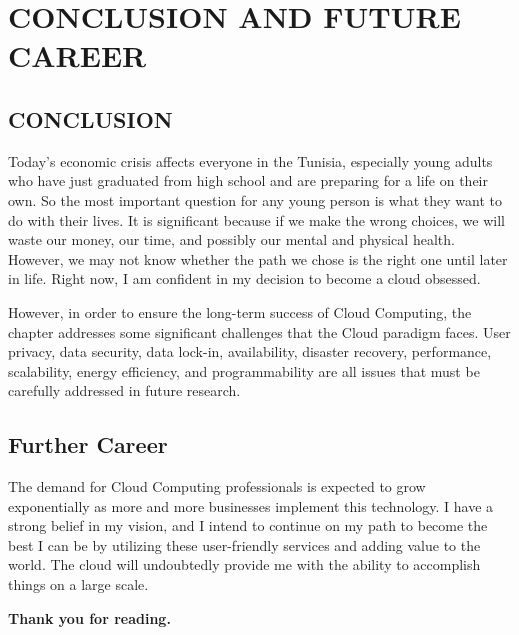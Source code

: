 \chapter*{CONCLUSION AND FUTURE CAREER}

\section{CONCLUSION}

Today's economic crisis affects everyone in the Tunisia, especially young adults who have just graduated from high school and are preparing for a life on their own. So the most important question for any young person is what they want to do with their lives. It is significant because if we make the wrong choices, we will waste our money, our time, and possibly our mental and physical health. However, we may not know whether the path we chose is the right one until later in life. Right now, I am confident in my decision to become a cloud obsessed.


However, in order to ensure the long-term success of Cloud Computing, the chapter addresses some significant challenges that the Cloud paradigm faces. User privacy, data security, data lock-in, availability, disaster recovery, performance, scalability, energy efficiency, and programmability are all issues that must be carefully addressed in future research.

\section{Further Career}
The demand for Cloud Computing professionals is expected to grow exponentially as more and more businesses implement this technology.
I have a strong belief in my vision, and I intend to continue on my path to become the best I can be by utilizing these user-friendly services and adding value to the world. The cloud will undoubtedly provide me with the ability to accomplish things on a large scale.


\begin{flushright}\LARGE
\bf{Thank you for reading.}
\end{flushright}
